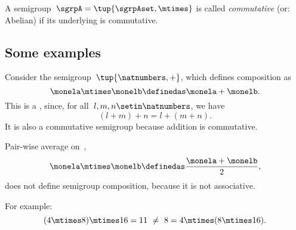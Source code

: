 \begin{definition}\label{def:commutative-semigroup}
    A semigroup~$\sgrpA = \tup{\sgrpAset, \mtimes}$ is called \emph{commutative} (or: Abelian) if its underlying  is commutative.
\end{definition}

\subsection{Some examples}

\begin{example}
    \label{exa:natnum-semigroup}
    Consider the semigroup~$\tup{\natnumbers,+}$, which defines composition as
    \begin{equation}
        \label{eq:natnum-semigroup-definition}
        \monela \mtimes \monelb \definedas  \monela + \monelb.
    \end{equation}
    This is a , since, for all~$l,m, n \setin \natnumbers$, we have
    \begin{equation}
        (l+m)
        +n = l+(m+n).
    \end{equation}
    It is also a commutative semigroup because addition is commutative.
\end{example}

\begin{example}
    Pair-wise average on~\reals,
    \begin{equation}
        \label{eq:pairwise}
        \monela \mtimes \monelb \definedas  \frac{\monela + \monelb}{2},
    \end{equation}
    does not define semigroup composition, because it is not associative.

    For example:
    \begin{equation}
        \label{eq:pairwise-counterexample}
        (4 \mtimes 8) \mtimes 16 = 11\  \neq\   8 = 4 \mtimes (8 \mtimes 16).
    \end{equation}
\end{example}


